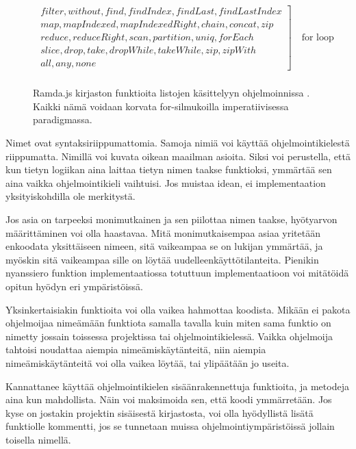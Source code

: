 \begin{figure}[ht]
    \centering
    \[
        \begin{array}{rl}
            \left.
            \begin{array}{l}
                filter, without, find, findIndex, findLast, findLastIndex \\
                map, mapIndexed, mapIndexedRight, chain, concat, zip      \\
                reduce, reduceRight, scan, partition, uniq, forEach       \\
                slice, drop, take, dropWhile, takeWhile, zip, zipWith     \\
                all, any, none
            \end{array}
            \right] \quad \text{for loop}
            \\
        \end{array}
    \]
    \caption{Ramda.js kirjaston funktioita listojen käsittelyyn ohjelmoinnissa \cite{ramda:docs}. Kaikki nämä voidaan korvata for-silmukoilla imperatiivisessa paradigmassa.}
    \label{fig:ramdacmds}
\end{figure}

Nimet ovat syntaksiriippumattomia. Samoja nimiä voi käyttää ohjelmointikielestä riippumatta. Nimillä voi kuvata oikean maailman asioita. Siksi voi perustella, että kun tietyn logiikan aina laittaa tietyn nimen taakse funktioksi, ymmärtää sen aina vaikka ohjelmointikieli vaihtuisi. Jos muistaa idean, ei implementaation yksityiskohdilla ole merkitystä.

Jos asia on tarpeeksi monimutkainen ja sen piilottaa nimen taakse, hyötyarvon määrittäminen voi olla haastavaa. Mitä monimutkaisempaa asiaa yritetään enkoodata yksittäiseen nimeen, sitä vaikeampaa se on lukijan ymmärtää, ja myöskin sitä vaikeampaa sille on löytää uudelleenkäyttötilanteita. Pienikin nyanssiero funktion implementaatiossa totuttuun implementaatioon voi mitätöidä opitun hyödyn eri ympäristöissä.

Yksinkertaisiakin funktioita voi olla vaikea hahmottaa koodista. Mikään ei pakota ohjelmoijaa nimeämään funktiota samalla tavalla kuin miten sama funktio on nimetty jossain toissessa projektissa tai ohjelmointikielessä. Vaikka ohjelmoija tahtoisi noudattaa aiempia nimeämiskäytänteitä, niin aiempia nimeämiskäytänteitä voi olla vaikea löytää, tai ylipäätään jo useita.

Kannattanee käyttää ohjelmointikielen sisäänrakennettuja funktioita, ja metodeja aina kun mahdollista. Näin voi maksimoida sen, että koodi ymmärretään. Jos kyse on jostakin projektin sisäisestä kirjastosta, voi olla hyödyllistä lisätä funktiolle kommentti, jos se tunnetaan muissa ohjelmointiympäristöissä jollain toisella nimellä.

